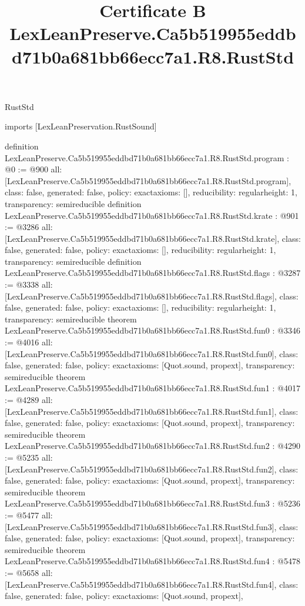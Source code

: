 \begin{lexlean}{RustStd}
\title{Certificate B LexLeanPreserve.Ca5b519955eddbd71b0a681bb66ecc7a1.R8.RustStd}
\begin{coremodule}
imports [LexLeanPreservation.RustSound]

definition LexLeanPreserve.Ca5b519955eddbd71b0a681bb66ecc7a1.R8.RustStd.program : @0 := @900 {
  all: [LexLeanPreserve.Ca5b519955eddbd71b0a681bb66ecc7a1.R8.RustStd.program],
  class: false,
  generated: false,
  policy: exact{axioms: []},
  reducibility: regular{height: 1},
  transparency: semireducible
}
definition LexLeanPreserve.Ca5b519955eddbd71b0a681bb66ecc7a1.R8.RustStd.krate : @901 := @3286 {
  all: [LexLeanPreserve.Ca5b519955eddbd71b0a681bb66ecc7a1.R8.RustStd.krate],
  class: false,
  generated: false,
  policy: exact{axioms: []},
  reducibility: regular{height: 1},
  transparency: semireducible
}
definition LexLeanPreserve.Ca5b519955eddbd71b0a681bb66ecc7a1.R8.RustStd.flags : @3287 := @3338 {
  all: [LexLeanPreserve.Ca5b519955eddbd71b0a681bb66ecc7a1.R8.RustStd.flags],
  class: false,
  generated: false,
  policy: exact{axioms: []},
  reducibility: regular{height: 1},
  transparency: semireducible
}
theorem LexLeanPreserve.Ca5b519955eddbd71b0a681bb66ecc7a1.R8.RustStd.fun0 : @3346 := @4016 {
  all: [LexLeanPreserve.Ca5b519955eddbd71b0a681bb66ecc7a1.R8.RustStd.fun0],
  class: false,
  generated: false,
  policy: exact{axioms: [Quot.sound, propext]},
  transparency: semireducible
}
theorem LexLeanPreserve.Ca5b519955eddbd71b0a681bb66ecc7a1.R8.RustStd.fun1 : @4017 := @4289 {
  all: [LexLeanPreserve.Ca5b519955eddbd71b0a681bb66ecc7a1.R8.RustStd.fun1],
  class: false,
  generated: false,
  policy: exact{axioms: [Quot.sound, propext]},
  transparency: semireducible
}
theorem LexLeanPreserve.Ca5b519955eddbd71b0a681bb66ecc7a1.R8.RustStd.fun2 : @4290 := @5235 {
  all: [LexLeanPreserve.Ca5b519955eddbd71b0a681bb66ecc7a1.R8.RustStd.fun2],
  class: false,
  generated: false,
  policy: exact{axioms: [Quot.sound, propext]},
  transparency: semireducible
}
theorem LexLeanPreserve.Ca5b519955eddbd71b0a681bb66ecc7a1.R8.RustStd.fun3 : @5236 := @5477 {
  all: [LexLeanPreserve.Ca5b519955eddbd71b0a681bb66ecc7a1.R8.RustStd.fun3],
  class: false,
  generated: false,
  policy: exact{axioms: [Quot.sound, propext]},
  transparency: semireducible
}
theorem LexLeanPreserve.Ca5b519955eddbd71b0a681bb66ecc7a1.R8.RustStd.fun4 : @5478 := @5658 {
  all: [LexLeanPreserve.Ca5b519955eddbd71b0a681bb66ecc7a1.R8.RustStd.fun4],
  class: false,
  generated: false,
  policy: exact{axioms: [Quot.sound, propext]},
}
\end{coremodule}
\end{lexlean}
